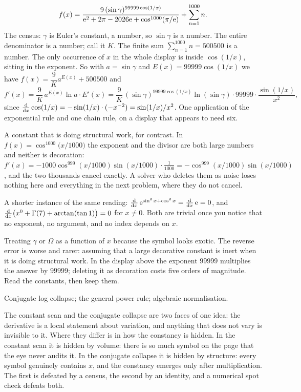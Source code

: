 \begin{worked}
\[
f(x)=\frac{9\,(\sin\gamma)^{99999\cos(1/x)}}{\mathrm{e}^{2}+2\pi-2026\mathrm{e}+\cos^{1000}(\pi/\mathrm{e})}+\sum_{n=1}^{1000}n .
\]
The census: $\gamma$ is Euler's constant, a number, so $\sin\gamma$ is a number. The entire denominator is a number; call it $K$. The finite sum $\sum_{n=1}^{1000}n=500500$ is a number. The only occurrence of $x$ in the whole display is inside $\cos(1/x)$, sitting in the exponent. So with $a=\sin\gamma$ and $E(x)=99999\cos(1/x)$ we have $f(x)=\dfrac{9}{K}a^{E(x)}+500500$ and
\[
f'(x)=\frac{9}{K}\,a^{E(x)}\ln a\cdot E'(x)=\frac{9}{K}\,(\sin\gamma)^{99999\cos(1/x)}\ln(\sin\gamma)\cdot 99999\cdot\frac{\sin(1/x)}{x^{2}},
\]
since $\frac{\mathrm{d}}{\mathrm{d}x}\cos(1/x)=-\sin(1/x)\cdot(-x^{-2})=\sin(1/x)/x^{2}$. One application of the exponential rule and one chain rule, on a display that appears to need six.

A constant that is doing structural work, for contrast. In $f(x)=\cos^{1000}\bigl(x/1000\bigr)$ the exponent and the divisor are both large numbers and neither is decoration: $f'(x)=-1000\cos^{999}(x/1000)\sin(x/1000)\cdot\tfrac{1}{1000}=-\cos^{999}(x/1000)\sin(x/1000)$, and the two thousands cancel exactly. A solver who deletes them as noise loses nothing here and everything in the next problem, where they do not cancel.

A shorter instance of the same reading: $\frac{\mathrm{d}}{\mathrm{d}x}\,\mathrm{e}^{\sin^{2}x+\cos^{2}x}=\frac{\mathrm{d}}{\mathrm{d}x}\,\mathrm{e}=0$, and $\frac{\mathrm{d}}{\mathrm{d}x}\bigl(x^{0}+\Gamma(7)+\arctan(\tan 1)\bigr)=0$ for $x\ne0$. Both are trivial once you notice that no exponent, no argument, and no index depends on $x$.
\end{worked}

\begin{trap}
Treating $\gamma$ or $\Omega$ as a function of $x$ because the symbol looks exotic. The reverse error is worse and rarer: assuming that a large decorative constant is inert when it is doing structural work. In the display above the exponent $99999$ multiplies the answer by $99999$; deleting it as decoration costs five orders of magnitude. Read the constants, then keep them.
\end{trap}

\begin{seealsob}Conjugate log collapse; the general power rule; algebraic normalisation.\end{seealsob}

The constant scan and the conjugate collapse are two faces of one idea: the derivative is a local statement about variation, and anything that does not vary is invisible to it. Where they differ is in how the constancy is hidden. In the constant scan it is hidden by volume: there is so much symbol on the page that the eye never audits it. In the conjugate collapse it is hidden by structure: every symbol genuinely contains $x$, and the constancy emerges only after multiplication. The first is defeated by a census, the second by an identity, and a numerical spot check defeats both.

